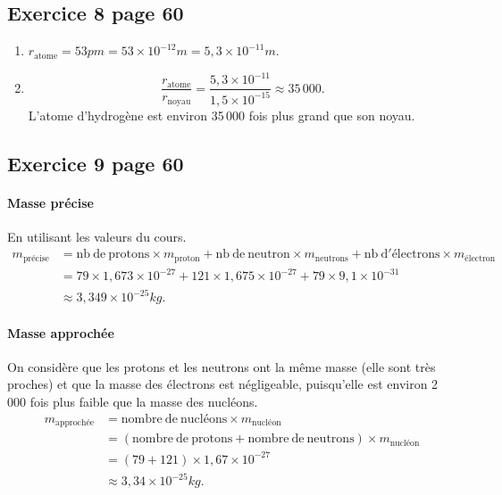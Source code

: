 \documentclass[12pt,a4paper]{article}
\begin{document}
\subsection*{Exercice 8 page 60}

\begin{enumerate}
\item $ r_\mathrm{atome} = \unit{53}{pm} = \unit{53\times 10^{-12}}{m} = \unit{5{,}3\times 10^{-11}}{m}$.
\item
\[
\frac{r_\mathrm{atome}}{r_\mathrm{noyau}} = \frac{5{,}3\times 10^{-11}}{1{,}5\times 10^{-15}} \approx 35\,000.
\]
L'atome d'hydrogène est environ 35\,000 fois plus grand que son noyau.
\end{enumerate}

\subsection*{Exercice 9 page 60}

\paragraph{Masse précise} En utilisant les valeurs du cours.
\begin{align*}
m_\mathrm{précise}	&= \mathrm{nb\ de\ protons} \times m_\mathrm{proton} + \mathrm{nb\ de\ neutron} \times m_\mathrm{neutrons} + \mathrm{nb\ d'électrons} \times m_\mathrm{électron} \\
											&= 79 \times 1{,}673\times 10^{-27} + 121 \times 1{,}675\times 10^{-27} + 79 \times 9{,}1\times 10^{-31} \\
											&\approx \unit{3{,}349\times10^{-25}}{kg}.
\end{align*}

\paragraph{Masse approchée} On considère que les protons et les neutrons ont la même masse (elle sont très proches) et que la masse des électrons est négligeable, puisqu'elle est environ 2\,000 fois plus faible que la masse des nucléons. 
\begin{align*}
m_\mathrm{approchée}	&= \mathrm{nombre\ de\ nucléons} \times m_\mathrm{nucléon} \\
											&= (\mathrm{nombre\ de\ protons} + \mathrm{nombre\ de\ neutrons}) \times m_\mathrm{nucléon} \\
											&= (79+121)\times 1{,}67\times 10^{-27} \\
											&\approx \unit{3{,}34\times10^{-25}}{kg}.
\end{align*}
\end{document}
